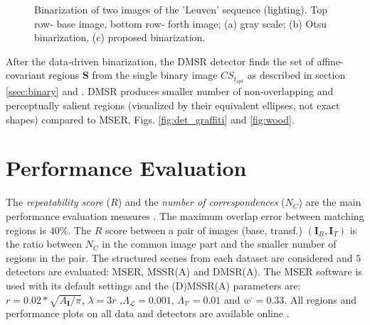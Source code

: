 \documentclass{article}
\def\I{{\mathbf I}}
\def\mcL{{\mathcal{L}}}
\def\mcV{{\mathcal{V}}}
\def\S{{\mathbf S}}
\begin{document}
\begin{figure}[htb]
 \vspace{-0.5cm}
\caption{Binarization of two images of the 'Leuven' sequence (lighting). Top row- base image, bottom row- forth image;   (a) gray scale; (b) Otsu binarization, (c) proposed binarization.}
\label{fig:leuven_bin}
%
\end{figure}

After the data-driven binarization, the DMSR detector finds the set of affine-covariant regions $\S$ from the single binary image $CS_{t_{opt}}$ as described in section \ref{ssec:binary} and \cite{RangMSSR06, RangHumpb06}. DMSR produces smaller number of non-overlapping and perceptually salient regions (visualized by their equivalent ellipses, not exact shapes) compared to MSER, Figs. \ref{fig:det_graffiti} and \ref{fig:wood}.

\section{Performance  Evaluation}
\label{sec:perf}
The {\em repeatability score} ($R$) and the {\em number of correspondences} ($N_C$) are the main performance evaluation measures \cite{Mikolajczyk:2005}. The maximum overlap error between matching regions is $40\%$. The $R$ score between a pair of images (base, transf.) $(\I_B,\I_T)$ is the ratio between $N_C$ in the common image part and the smaller number of regions in the pair. The structured scenes from each dataset are considered and $5$ detectors are evaluated: MSER, MSSR(A) and DMSR(A). The MSER software is used with its default settings and the (D)MSSR(A) parameters are: $r = 0.02*\sqrt{A_{\I} / \pi}$, $\lambda=3r$ ,$\Lambda_{\mcL}=0.001$, $\Lambda_{\mcV}=0.01$ and  $w^{\cdot}=0.33$.  
All regions and performance plots on all data and detectors are available online \cite{Rang:html_res}.
\end{document}
